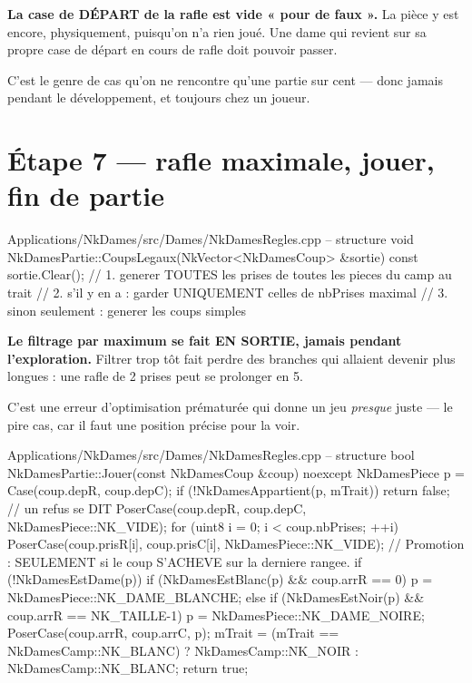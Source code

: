 \begin{nkpiege}
\textbf{La case de DÉPART de la rafle est vide « pour de faux ».} La pièce y est
encore, physiquement, puisqu'on n'a rien joué. Une dame qui revient sur sa
propre case de départ en cours de rafle doit pouvoir passer.

C'est le genre de cas qu'on ne rencontre qu'une partie sur cent --- donc jamais
pendant le développement, et toujours chez un joueur.
\end{nkpiege}

\section{Étape 7 --- rafle maximale, jouer, fin de partie}

\begin{nkcode}{Applications/NkDames/src/Dames/NkDamesRegles.cpp -- structure}
void NkDamesPartie::CoupsLegaux(NkVector<NkDamesCoup> &sortie) const {
    sortie.Clear();
    // 1. generer TOUTES les prises de toutes les pieces du camp au trait
    // 2. s'il y en a : garder UNIQUEMENT celles de nbPrises maximal
    // 3. sinon seulement : generer les coups simples
}
\end{nkcode}

\begin{nkretenir}
\textbf{Le filtrage par maximum se fait EN SORTIE, jamais pendant
l'exploration.} Filtrer trop tôt fait perdre des branches qui allaient devenir
plus longues : une rafle de 2 prises peut se prolonger en 5.

C'est une erreur d'optimisation prématurée qui donne un jeu \emph{presque}
juste --- le pire cas, car il faut une position précise pour la voir.
\end{nkretenir}

\begin{nkcode}{Applications/NkDames/src/Dames/NkDamesRegles.cpp -- structure}
bool NkDamesPartie::Jouer(const NkDamesCoup &coup) noexcept {
    NkDamesPiece p = Case(coup.depR, coup.depC);
    if (!NkDamesAppartient(p, mTrait)) {
        return false;                       // un refus se DIT
    }
    PoserCase(coup.depR, coup.depC, NkDamesPiece::NK_VIDE);
    for (uint8 i = 0; i < coup.nbPrises; ++i) {
        PoserCase(coup.prisR[i], coup.prisC[i], NkDamesPiece::NK_VIDE);
    }
    // Promotion : SEULEMENT si le coup S'ACHEVE sur la derniere rangee.
    if (!NkDamesEstDame(p)) {
        if (NkDamesEstBlanc(p) && coup.arrR == 0)              { p = NkDamesPiece::NK_DAME_BLANCHE; }
        else if (NkDamesEstNoir(p) && coup.arrR == NK_TAILLE-1) { p = NkDamesPiece::NK_DAME_NOIRE; }
    }
    PoserCase(coup.arrR, coup.arrC, p);
    mTrait = (mTrait == NkDamesCamp::NK_BLANC) ? NkDamesCamp::NK_NOIR : NkDamesCamp::NK_BLANC;
    return true;
}
\end{nkcode}

